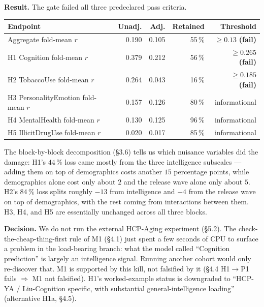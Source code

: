 \documentclass[11pt,letterpaper]{report}
\begin{document}
\textbf{Result.} The gate failed all three predeclared pass criteria.

{}
\begin{center}
\small
\setlength{\tabcolsep}{4pt}
\renewcommand{\arraystretch}{1.12}
\begin{tabularx}{\textwidth}{@{}>{\raggedright\arraybackslash}Xrrrr@{}}
\toprule
\textbf{Endpoint} & \textbf{Unadj.} & \textbf{Adj.} & \textbf{Retained} & \textbf{Threshold} \\
\midrule
Aggregate fold-mean $r$ & 0.190 & 0.105 & 55\,\% & $\ge 0.13$ \textbf{(fail)} \\
H1 Cognition fold-mean $r$ & 0.379 & 0.212 & 56\,\% & $\ge 0.265$ \textbf{(fail)} \\
H2 TobaccoUse fold-mean $r$ & 0.264 & 0.043 & 16\,\% & $\ge 0.185$ \textbf{(fail)} \\
H3 PersonalityEmotion fold-mean $r$ & 0.157 & 0.126 & 80\,\% & informational \\
H4 MentalHealth fold-mean $r$ & 0.130 & 0.125 & 96\,\% & informational \\
H5 IllicitDrugUse fold-mean $r$ & 0.020 & 0.017 & 85\,\% & informational \\
\bottomrule
\end{tabularx}
\end{center}

The block-by-block decomposition (\S3.6) tells us which nuisance variables did the damage: H1's $44\,\%$ loss came mostly from the three intelligence subscales --- adding them on top of demographics costs another $15$ percentage points, while demographics alone cost only about $2$ and the release wave alone only about $5$. H2's $84\,\%$ loss splits roughly $-13$ from intelligence and $-4$ from the release wave on top of demographics, with the rest coming from interactions between them. H3, H4, and H5 are essentially unchanged across all three blocks.

\textbf{Decision.} We do not run the external HCP-Aging experiment (\S5.2). The check-the-cheap-thing-first rule of M1 (\S4.1) just spent a few seconds of CPU to surface a problem in the load-bearing branch: what the model called ``Cognition prediction'' is largely an intelligence signal. Running another cohort would only re-discover that. M1 is supported by this kill, not falsified by it (\S4.4 H1$\rightarrow$P1 fails $\Rightarrow$ M1 not falsified). H1's worked-example status is downgraded to ``HCP-YA / Liu-Cognition specific, with substantial general-intelligence loading'' (alternative H1a, \S4.5).
\end{document}
